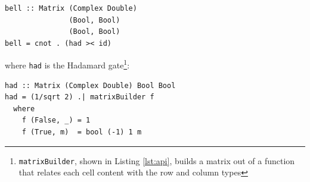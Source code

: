 \documentclass[sigplan,screen]{acmart}
\newcommand{\hs}{\texttt}
\begin{document}
\begin{verbatim}
bell :: Matrix (Complex Double) 
               (Bool, Bool) 
               (Bool, Bool)
bell = cnot . (had >< id)
\end{verbatim}
where \hs{had} is the Hadamard gate\footnote{\hs{matrixBuilder}, shown in Listing \ref{lst:api}, builds a matrix out of a function that relates each cell content with the row and column types}:
\begin{verbatim}
had :: Matrix (Complex Double) Bool Bool
had = (1/sqrt 2) .| matrixBuilder f
  where
    f (False, _) = 1
    f (True, m)  = bool (-1) 1 m
\end{verbatim}
%
%
%
\end{document}
